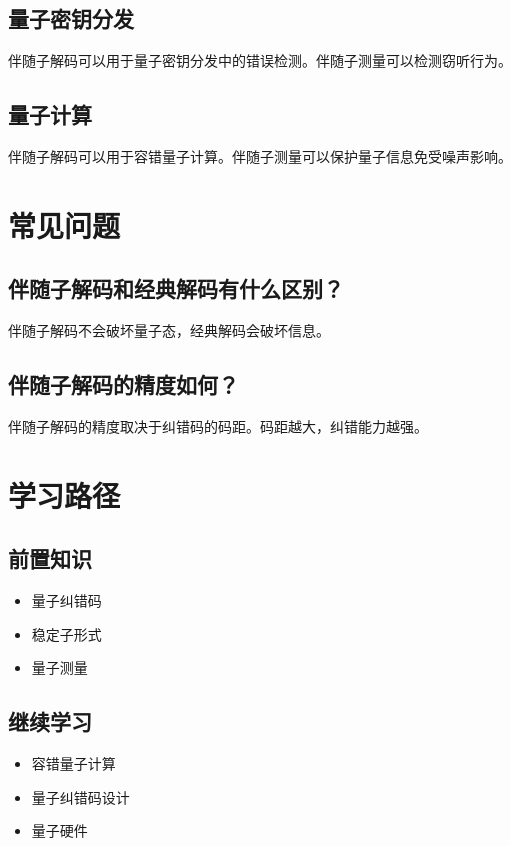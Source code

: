 \documentclass[12pt,a4paper]{article}
\begin{document}
\subsection{量子密钥分发}

伴随子解码可以用于量子密钥分发中的错误检测。伴随子测量可以检测窃听行为。

\subsection{量子计算}

伴随子解码可以用于容错量子计算。伴随子测量可以保护量子信息免受噪声影响。

\section{常见问题}

\subsection{伴随子解码和经典解码有什么区别？}

伴随子解码不会破坏量子态，经典解码会破坏信息。

\subsection{伴随子解码的精度如何？}

伴随子解码的精度取决于纠错码的码距。码距越大，纠错能力越强。

\section{学习路径}

\subsection{前置知识}
\begin{itemize}
  \item 量子纠错码
  \item 稳定子形式
  \item 量子测量
\end{itemize}

\subsection{继续学习}
\begin{itemize}
  \item 容错量子计算
  \item 量子纠错码设计
  \item 量子硬件
\end{itemize}
\end{document}
